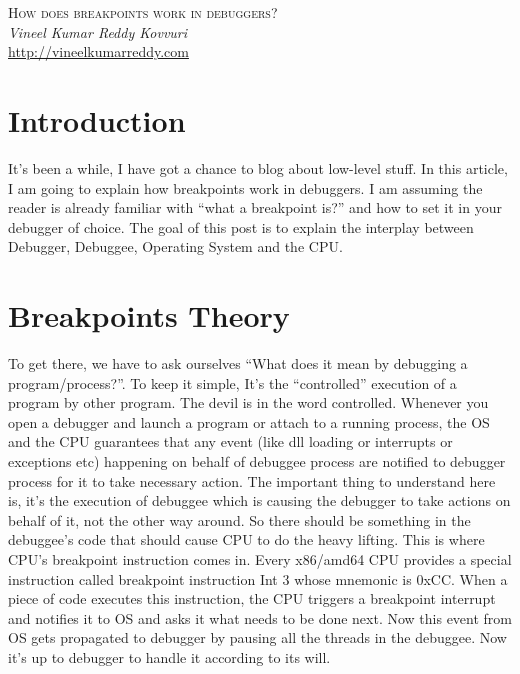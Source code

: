 \documentclass{article}
\begin{document}
\begin{titlepage}
   \begin{center}
      \Large\textsc{How does breakpoints work in debuggers?}\\
      \vspace{5mm}
      \Large\textit{Vineel Kumar Reddy Kovvuri}\\
      \url{http://vineelkumarreddy.com}\\
   \end{center}
\end{titlepage}

\tableofcontents

\newpage
\section{Introduction}
It’s been a while, I have got a chance to blog about low-level stuff. In this article, I am going to explain how breakpoints work in debuggers. I am assuming the reader is already familiar with “what a breakpoint is?” and how to set it in your debugger of choice. The goal of this post is to explain the interplay between Debugger, Debuggee, Operating System and the CPU.

\section{Breakpoints Theory}
To get there, we have to ask ourselves  “What does it mean by debugging a program/process?”. To keep it simple, It’s the “controlled” execution of a program by other program. The devil is in the word controlled. Whenever you open a debugger and launch a program or attach to a running process, the OS and the CPU guarantees that any event (like dll loading or interrupts or exceptions etc) happening on behalf of debuggee process are notified to debugger process for it to take necessary action. The important thing to understand here is, it’s the execution of debuggee which is causing the debugger to take actions on behalf of it, not the other way around.  So there should be something in the debuggee’s code that should cause CPU to do the heavy lifting.  This is where CPU’s breakpoint instruction comes in. Every x86/amd64 CPU provides a special instruction called breakpoint instruction Int 3 whose mnemonic is 0xCC. When a piece of code executes this instruction, the CPU triggers a breakpoint interrupt and notifies it to OS and asks it what needs to be done next. Now this event from OS gets propagated to debugger by pausing all the threads in the debuggee. Now it’s up to debugger to handle it according to its will.
\end{document}
